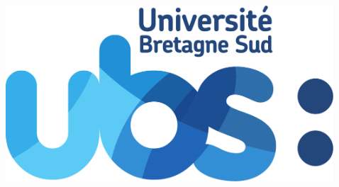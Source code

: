 \documentclass[hidelinks, french, xcolor={table, rgb, dvipsnames, x11names}, aspectratio=169, professionalfonts]{beamer}
\begin{document}
\begin{frame}
\begin{columns}
\begin{column}{.6\linewidth}
\begin{columns}
\begin{column}{.16\linewidth}
        \end{column}
        \begin{column}{.15\linewidth}\centering
          \includegraphics[width=\linewidth]{universite-bretagne-sud.eps.pdf}
          \hfill
        \end{column}
        \begin{column}{.22\linewidth}
          \hfill
        \end{column}
      \end{columns}
    \end{column}
  \end{columns}
\end{frame}
\end{document}
